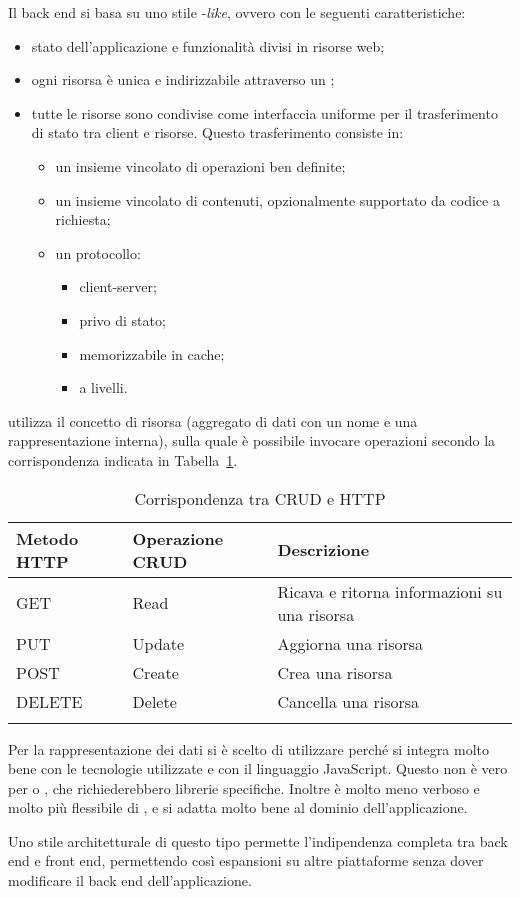 Il back end si basa su uno stile -\textit{like}, ovvero con le seguenti caratteristiche:
\begin{itemize}
\item stato dell'applicazione e funzionalità divisi in risorse web;
\item ogni risorsa è unica e indirizzabile attraverso un ;
\item tutte le risorse sono condivise come interfaccia uniforme per il trasferimento di stato tra client e risorse. Questo trasferimento consiste in:
\begin{itemize}
\item un insieme vincolato di operazioni ben definite;
\item un insieme vincolato di contenuti, opzionalmente supportato da codice a richiesta;
\item un protocollo:
\begin{itemize}
\item client-server;
\item privo di stato;
\item memorizzabile in cache;
\item a livelli.
\end{itemize}
\end{itemize}
\end{itemize}

 utilizza il concetto di risorsa (aggregato di dati con un nome e una rappresentazione interna), sulla quale è possibile invocare operazioni  secondo la corrispondenza indicata in Tabella~\ref{tab:RESTCRUD}.
\begin{center}
  \bgroup
  
  \begin{longtable}{ | m{2cm} | m{2cm} | p{7cm} |}
    \hline
    \cellcolor[gray]{0.9}\textbf{Metodo HTTP} & \cellcolor[gray]{0.9}\textbf{Operazione CRUD} & \cellcolor[gray]{0.9}\textbf{Descrizione} \\ \hline
    GET & Read & Ricava e ritorna informazioni su una risorsa \\ \hline
    PUT & Update & Aggiorna una risorsa \\ \hline
    POST & Create & Crea una risorsa \\ \hline
    DELETE & Delete & Cancella una risorsa \\ \hline
    \caption[Corrispondenza tra CRUD e HTTP]{Corrispondenza tra CRUD e HTTP}
    \label{tab:RESTCRUD} 
    \end{longtable}
  \egroup
\end{center} 
Per la rappresentazione dei dati si è scelto di utilizzare  perché si integra molto bene con le tecnologie utilizzate e con il linguaggio JavaScript. Questo non è vero per  o , che richiederebbero librerie specifiche. Inoltre  è molto meno verboso e molto più flessibile di , e si adatta molto bene al dominio dell'applicazione.

Uno stile architetturale di questo tipo permette l'indipendenza completa tra back end e front end, permettendo così espansioni su altre piattaforme senza dover modificare il back end dell'applicazione.